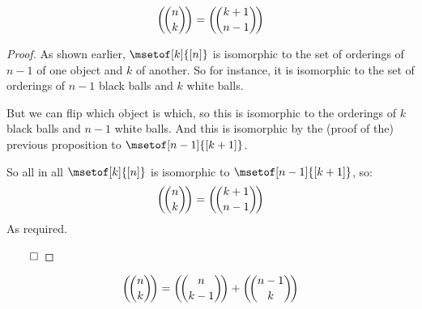 \begin{prop*}

	\[ \left(\!\binom{n}{k}\!\right) = \left(\!\binom{k+1}{n-1}\!\right) \]

\end{prop*}

\begin{proof}

	As shown earlier, $\msetof[k]{[n]}$ is isomorphic to the set of orderings of $n-1$ of one object and $k$ of another.
	So for instance, it is isomorphic to the set of orderings of $n-1$ black balls and $k$ white balls.

	But we can flip which object is which, so this is isomorphic to the orderings of $k$ black balls and $n-1$ white balls.
	And this is isomorphic by the (proof of the) previous proposition to $\msetof[n-1]{[k+1]}$.

	So all in all $\msetof[k]{[n]}$ is isomorphic to $\msetof[n-1]{[k+1]}$, so:
	\[ \left(\!\binom{n}{k}\!\right) = \left(\!\binom{k+1}{n-1}\!\right) \]
	As required.

\hfill$\qed$

\end{proof}

\begin{prop*}

	\[ \left(\!\binom{n}{k}\!\right) = \left(\!\binom{n}{k-1}\!\right) + \left(\!\binom{n-1}{k}\!\right) \]

\end{prop*}


